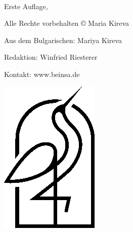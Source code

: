 {\small
\setlength{\parindent}{0em}\setlength{\parskip}{0.1em}
~
\vfill

Erste Auflage, \editionyear{}

Alle Rechte vorbehalten \copyright{} \editionyear{} Maria Kireva

Aus dem Bulgarischen: Mariya Kireva

Redaktion: Winfried Riesterer

Kontakt: www.beinsa.de


\ifx\isbn\undefined\else\if\relax\detokenize\expandafter{\isbn}\relax{}\fi\fi

\includegraphics[width=0.07\linewidth]{frontmatter/logo-black.png}

\publisher{}
}
